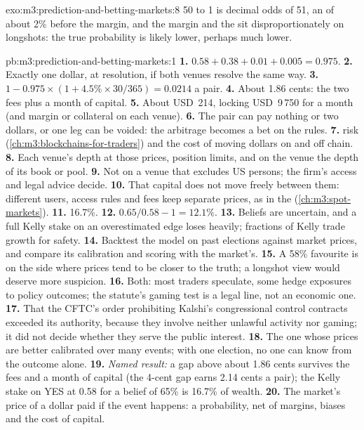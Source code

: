 \begin{solution}{exo:m3:prediction-and-betting-markets:8}
50 to 1 is decimal odds of 51, an  of about 2\% before the margin, and the margin and the  sit
disproportionately on longshots: the true probability is likely lower, perhaps much lower.
\end{solution}

\begin{solution}{pb:m3:prediction-and-betting-markets:1}
\textbf{1.} $0.58 + 0.38 + 0.01 + 0.005 = 0.975$. \textbf{2.} Exactly one dollar, at resolution, if both venues resolve the same way. \textbf{3.} $1 - 0.975
\times (1 + 4.5\% \times 30/365) = 0.0214$ a pair. \textbf{4.} About 1.86 cents: the two fees plus a month of capital. \textbf{5.} About USD~214, locking
USD~9\,750 for a month (and margin or collateral on each venue). \textbf{6.} The pair can pay nothing or two dollars, or one leg can be voided: the
arbitrage becomes a bet on the rules. \textbf{7.}  risk (\cref{ch:m3:blockchains-for-traders}) and the cost of moving dollars on and off chain.
\textbf{8.} Each venue's depth at those prices, position limits, and on the  venue the depth of its book or pool. \textbf{9.} Not on a venue that
excludes US persons; the firm's access and legal advice decide. \textbf{10.} That capital does not move freely between them: different users, access rules
and fees keep separate prices, as in the  (\cref{ch:m3:spot-markets}). \textbf{11.} 16.7\%. \textbf{12.} $0.65/0.58 - 1 = 12.1\%$. \textbf{13.}
Beliefs are uncertain, and a full Kelly stake on an overestimated edge loses heavily; fractions of Kelly trade growth for safety. \textbf{14.} Backtest the
model on past elections against market prices, and compare its calibration and scoring with the market's. \textbf{15.} A 58\% favourite is on the side where
prices tend to be closer to the truth; a longshot view would deserve more suspicion. \textbf{16.} Both: most traders speculate, some hedge exposures to policy
outcomes; the statute's gaming test is a legal line, not an economic one. \textbf{17.} That the CFTC's order prohibiting Kalshi's congressional control
contracts exceeded its authority, because they involve neither unlawful activity nor gaming; it did not decide whether they serve the public interest.
\textbf{18.} The one whose prices are better calibrated over many events; with one election, no one can know from the outcome alone. \textbf{19.}
\emph{Named result:} a gap above about 1.86 cents survives the fees and a month of capital (the 4-cent gap earns 2.14 cents a pair); the Kelly stake on YES at
0.58 for a belief of 65\% is 16.7\% of wealth. \textbf{20.} The market's price of a dollar paid if the event happens: a probability, net of margins, biases and
the cost of capital.
\end{solution}

